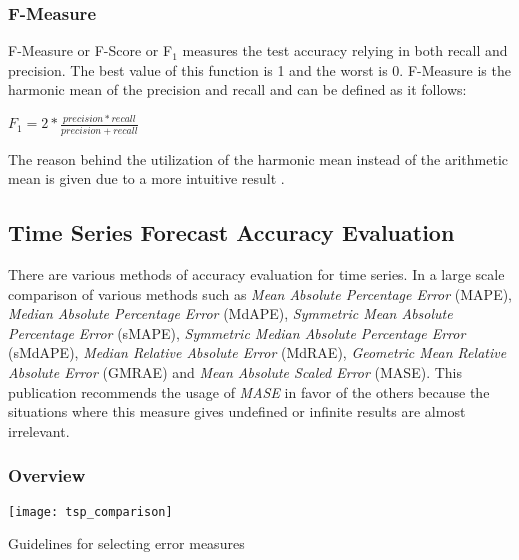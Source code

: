 \subsubsection{F-Measure}

F-Measure or F-Score or F\begin{math}_1 \end{math} measures the test accuracy
  relying in both recall and precision. The best value of this function is 1 and
  the worst is 0. F-Measure is the harmonic mean of the precision and recall and
  can be defined as it follows:

\begin{center} \Large \begin{math} F_1 = 2 *
\frac{precision*recall}{precision+recall} \end{math} \normalsize \end{center}

The reason behind the utilization of the harmonic mean instead of the arithmetic
mean is given due to a more intuitive result \cite{sasaki2007truth}. \\

\subsection{Time Series Forecast Accuracy Evaluation}

There are various methods of accuracy evaluation for time series. In
\cite{Hyndman2006679} a large scale comparison of various methods such as
\emph{Mean Absolute Percentage Error} (MAPE), \emph{Median Absolute Percentage
Error} (MdAPE), \emph{Symmetric Mean Absolute Percentage Error} (sMAPE),
\emph{Symmetric Median Absolute Percentage Error} (sMdAPE), \emph{Median
Relative Absolute Error} (MdRAE), \emph{Geometric Mean Relative Absolute
Error} (GMRAE) and \emph{Mean Absolute Scaled Error} (MASE). This publication
recommends the usage of \emph{MASE} in favor of the others because the
situations where this measure gives undefined or infinite results are almost
irrelevant.

\subsubsection{Overview}
\begin{table}[h] \begin{center} \leavevmode
\texttt{[image: tsp\_comparison]} \caption{Guidelines for
selecting error measures \cite{Armstrong199269} } \label{fig:ts_error_selection}
\end{center} \end{table}

